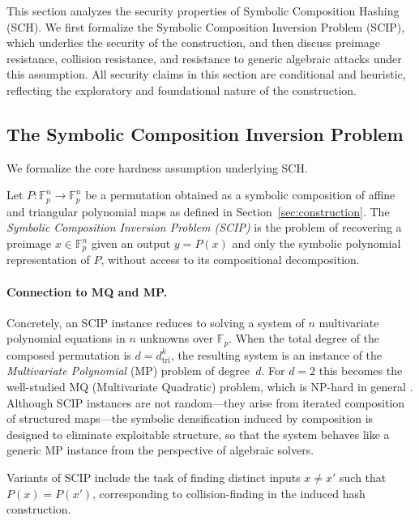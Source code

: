 ﻿\documentclass[english]{aucmcs}
\newcommand{\Fp}{\mathbb{F}_p}
\begin{document}
This section analyzes the security properties of Symbolic Composition Hashing (SCH). We first formalize the Symbolic Composition Inversion Problem (SCIP), which underlies the security of the construction, and then discuss preimage resistance, collision resistance, and resistance to generic algebraic attacks under this assumption. All security claims in this section are conditional and heuristic, reflecting the exploratory and foundational nature of the construction.



\subsection{The Symbolic Composition Inversion Problem}

We formalize the core hardness assumption underlying SCH.

\begin{definition}
\label{def:scip}
Let $P : \Fp^n \to \Fp^n$ be a permutation obtained as a symbolic composition of affine and triangular polynomial maps as defined in Section~\ref{sec:construction}. The \emph{Symbolic Composition Inversion Problem (SCIP)} is the problem of recovering a preimage $x \in \Fp^n$ given an output $y = P(x)$ and only the symbolic polynomial representation of $P$, without access to its compositional decomposition.
\end{definition}

\paragraph{Connection to MQ and MP.}
Concretely, an SCIP instance reduces to solving a system of $n$ multivariate
polynomial equations in $n$ unknowns over $\Fp$. When the total degree of the
composed permutation is $d = d_{\mathrm{tri}}^k$, the resulting system is an
instance of the \emph{Multivariate Polynomial} (MP) problem of degree~$d$.
For $d = 2$ this becomes the well-studied MQ (Multivariate Quadratic) problem,
which is NP-hard in general \cite{MQSurvey}. Although SCIP instances are not
random---they arise from iterated composition of structured maps---the
symbolic densification induced by composition is designed to eliminate
exploitable structure, so that the system behaves like a generic MP instance
from the perspective of algebraic solvers.

Variants of SCIP include the task of finding distinct inputs $x \neq x'$ such that $P(x) = P(x')$, corresponding to collision-finding in the induced hash construction.
\end{document}
